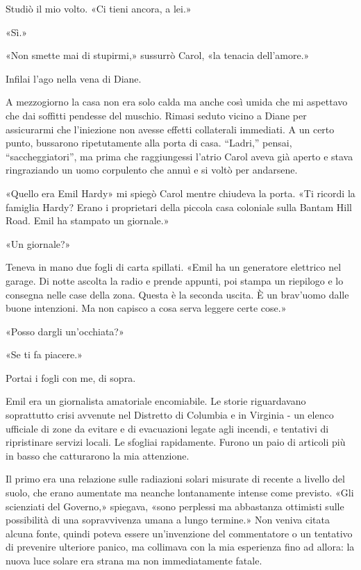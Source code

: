 Studiò il mio volto. «Ci tieni ancora, a lei.»

«Sì.»

«Non smette mai di stupirmi,» sussurrò Carol, «la tenacia dell'amore.»

Infilai l'ago nella vena di Diane.

\separatorefiori

A mezzogiorno la casa non era solo calda ma anche così umida che mi
aspettavo che dai soffitti pendesse del muschio. Rimasi seduto vicino a
Diane per assicurarmi che l'iniezione non avesse effetti collaterali
immediati. A un certo punto, bussarono ripetutamente alla porta di casa.
``Ladri,'' pensai, ``saccheggiatori'', ma prima che raggiungessi l'atrio
Carol aveva già aperto e stava ringraziando un uomo corpulento che annuì
e si voltò per andarsene.

«Quello era Emil Hardy» mi spiegò Carol mentre chiudeva la porta. «Ti
ricordi la famiglia Hardy? Erano i proprietari della piccola casa
coloniale sulla Bantam Hill Road. Emil ha stampato un giornale.»

«Un giornale?»

Teneva in mano due fogli di carta spillati. «Emil ha un generatore
elettrico nel garage. Di notte ascolta la radio e prende appunti, poi
stampa un riepilogo e lo consegna nelle case della zona. Questa è la
seconda uscita. È un brav'uomo dalle buone intenzioni. Ma non capisco a
cosa serva leggere certe cose.»

«Posso dargli un'occhiata?»

«Se ti fa piacere.»

Portai i fogli con me, di sopra.

Emil era un giornalista amatoriale encomiabile. Le storie riguardavano
soprattutto crisi avvenute nel Distretto di Columbia e in Virginia - un
elenco ufficiale di zone da evitare e di evacuazioni legate agli
incendi, e tentativi di ripristinare servizi locali. Le sfogliai
rapidamente. Furono un paio di articoli più in basso che catturarono la
mia attenzione.

Il primo era una relazione sulle radiazioni solari misurate di recente a
livello del suolo, che erano aumentate ma neanche lontanamente intense
come previsto. «Gli scienziati del Governo,» spiegava, «sono perplessi
ma abbastanza ottimisti sulle possibilità di una sopravvivenza umana a
lungo termine.» Non veniva citata alcuna fonte, quindi poteva essere
un'invenzione del commentatore o un tentativo di prevenire ulteriore
panico, ma collimava con la mia esperienza fino ad allora: la nuova luce
solare era strana ma non immediatamente fatale.

